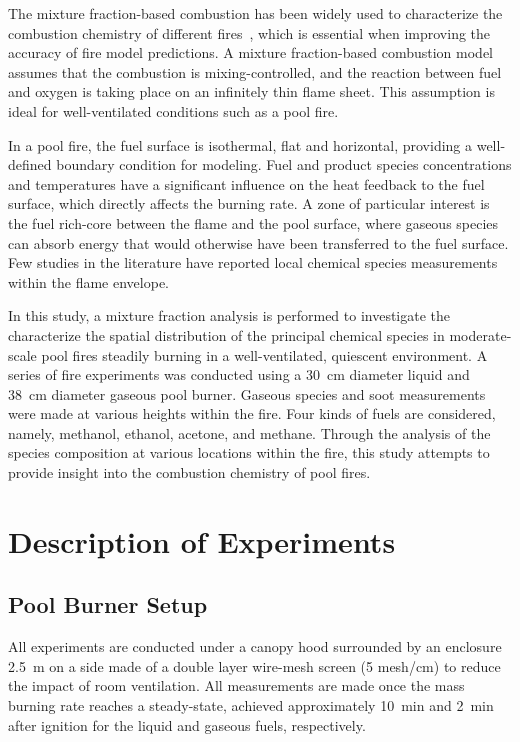 \documentclass[preprint,review,12pt]{elsarticle}
\begin{document}
The mixture fraction-based combustion has been widely used to characterize the combustion chemistry of different fires~\cite{Bilger1977,Peters1984,Floyd2001,Hamins1987,Sivathanu1990}, which is essential when improving the accuracy of fire model predictions. A mixture fraction-based combustion model assumes that the combustion is mixing-controlled, and the reaction between fuel and oxygen is taking place on an infinitely thin flame sheet. This assumption is ideal for well-ventilated conditions such as a pool fire.

In a pool fire, the fuel surface is isothermal, flat and horizontal, providing a well-defined boundary condition for modeling. Fuel and product species concentrations and temperatures have a significant influence on the heat feedback to the fuel surface, which directly affects the burning rate. A zone of particular interest is the fuel rich-core between the flame and the pool surface, where gaseous species can absorb energy that would otherwise have been transferred to the fuel surface. Few studies in the literature have reported local chemical species measurements within the flame envelope.

In this study, a mixture fraction analysis is performed to investigate the characterize the spatial distribution of the principal chemical species in moderate-scale pool fires steadily burning in a well-ventilated, quiescent environment. A series of fire experiments was conducted using a 30~cm diameter liquid and 38~cm diameter gaseous pool burner. Gaseous species and soot measurements were made at various heights within the fire. Four kinds of fuels are considered, namely, methanol, ethanol, acetone, and methane. Through the analysis of the species composition at various locations within the fire, this study attempts to provide insight into the combustion chemistry of pool fires.


\section{Description of Experiments}
\label{sec:Experiments}

\subsection{Pool Burner Setup}
\label{ssec:Pool_Burner_Setup}
All experiments are conducted under a canopy hood surrounded by an enclosure 2.5~m on a side made of a double layer wire-mesh screen (5 mesh/cm) to reduce the impact of room ventilation. All measurements are made once the mass burning rate reaches a steady-state, achieved approximately 10~min and 2~min after ignition for the liquid and gaseous fuels, respectively.
\end{document}

